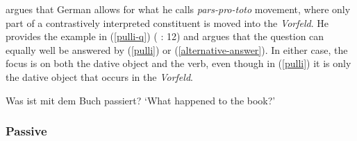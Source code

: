 \documentclass[output=paper]{langsci/langscibook}
\begin{document}
\begin{exe}\label{vf-expletive}
\ex
\begin{xlist}
\ex
\begin{xlist}\label{vf-vf-es}
\end{xlist}
\end{xlist}
\end{exe}

\cite{Fanselow:04} argues that  German allows for what he calls  \textit{pars-pro-toto} movement, where only part of a contrastively interpreted constituent is moved into the \textit{Vorfeld}. He provides the example in (\ref{pulli-q}) (\citeauthor{Fanselow:04} \citeyear{Fanselow:04}: 12) and argues that the question can equally well be answered by (\ref{pulli}) or (\ref{alternative-answer}). In either case, the focus is on both the dative object and the verb, even though in (\ref{pulli}) it is only the dative object that occurs in the \textit{Vorfeld}.

\begin{exe}
\ex Was ist mit dem Buch passiert? \quad `What happened to the book?' \label{pulli-q}
\begin{xlist}
\end{xlist}
\end{exe}


\subsubsection{Passive}
\end{document}
